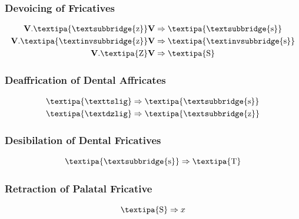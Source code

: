 \documentclass{report}[12pt]
\begin{document}
\subsubsection{Devoicing of Fricatives}\label{sec:devoice_fric}

\begin{tcolorbox}
  \begin{align*}
    \textbf{V}.\text{\textipa{\textsubbridge{z}}}\textbf{V} & \Rightarrow \text{\textipa{\textsubbridge{s}}} \\
    \textbf{V}.\text{\textipa{\textinvsubbridge{z}}}\textbf{V} & \Rightarrow \text{\textipa{\textinvsubbridge{s}}} \\
    \textbf{V}.\text{\textipa{Z}}\textbf{V} & \Rightarrow \text{\textipa{S}} \\
  \end{align*}
\end{tcolorbox}

\subsubsection{Deaffrication of Dental Affricates}\label{sec:deaffric_dental_affric}

\begin{tcolorbox}
  \begin{align*}
    \text{\textipa{\texttslig}} & \Rightarrow \text{\textipa{\textsubbridge{s}}} \\
    \text{\textipa{\textdzlig}} & \Rightarrow \text{\textipa{\textsubbridge{z}}} \\
  \end{align*}
\end{tcolorbox}

\subsubsection{Desibilation of Dental Fricatives}\label{sec:desibil_dental_fric}

\begin{tcolorbox}
  \[ \text{\textipa{\textsubbridge{s}}} \Rightarrow \text{\textipa{T}} \]
\end{tcolorbox}

\subsubsection{Retraction of Palatal Fricative}

\begin{tcolorbox}
  \[ \text{\textipa{S}} \Rightarrow x \]  
\end{tcolorbox}
\end{document}
